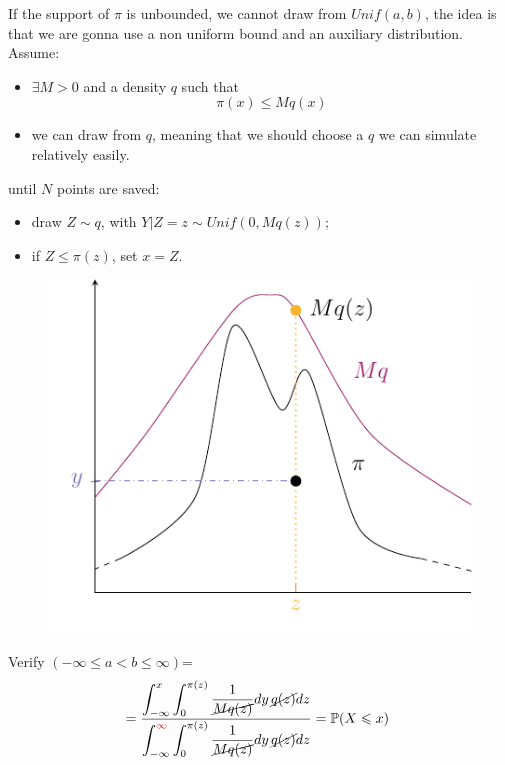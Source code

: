 \documentclass{article}
\begin{document}
If the support of $\pi$ is unbounded, we cannot draw from $Unif(a,b)$, the idea is that we are gonna use a non uniform bound and an auxiliary distribution. \\
Assume:
\begin{itemize}
    \item $\exists M>0$ and a density $q$ such that
    \begin{equation*}
        \pi (x) \leq Mq(x)
    \end{equation*}
    \item we can draw from $q$, meaning that we should choose a $q$ we can simulate relatively easily.
\end{itemize}
\begin{algorithm}
    until $N$ points are saved:
\begin{itemize}
    \item draw $Z\sim q$, with $Y|Z=z\sim Unif(0, Mq(z))$;
    \item if $Z\leqslant\pi(z)$, set $x=Z$.
\end{itemize}
\end{algorithm}
\begin{figure}[H]
\centering
\includegraphics{standalones/pdfs/rejection2}
    \label{res2}
\end{figure}
Verify $(-\infty\leqslant a < b \leqslant\infty)$=\[
=\dfrac{\displaystyle\int_{-\infty}^{x}\int_0^{\pi(z)}\frac{1}{\cancel{Mq(z)}}dy\,\cancel{q(z)}dz}{\displaystyle\int_{-\infty}^{\textcolor{red}{\infty}}\int_0^{\pi(z)}\frac{1}{\cancel{Mq(z)}}dy\,\cancel{q(z)}dz}=\mathbb{P}(X\leqslant x)\
\]
\end{document}
